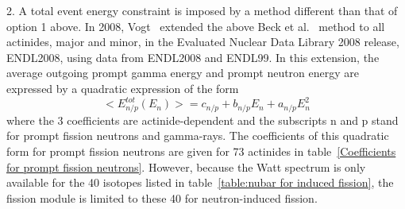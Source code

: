 \begin{list}{}
\item 2.  A total event 
energy constraint is imposed by a method different than that of option 
1 above. In 2008, Vogt~\cite{Vogt 2008} extended the above Beck et
al.~\cite{Beck 2007} method to all actinides, major and minor, in the
Evaluated Nuclear Data Library 2008 release, ENDL2008, using data from
ENDL2008 and ENDL99. In this extension, the average outgoing prompt
gamma energy and prompt neutron energy are expressed by a quadratic
expression of the form
\begin{equation}
<E^{tot}_{n/p}\left( E_n \right)> = c_{n/p}+b_{n/p} E_n+a_{n/p} E_n^2
\label{Quadratic expression for the energy-dependent average outgoing prompt
fission neutron/gamma energy}
\end{equation}
where the 3 coefficients are actinide-dependent and the subscripts n and p 
stand for prompt fission neutrons and gamma-rays. The coefficients
of this quadratic form for prompt fission neutrons are given for 
73 actinides in table~\ref{Coefficients for prompt fission neutrons}. 
However, because the Watt spectrum is only available for the 40 isotopes
listed in table~\ref{table:nubar for induced fission}, the fission module is
limited to these 40 for neutron-induced fission.

\end{list}

